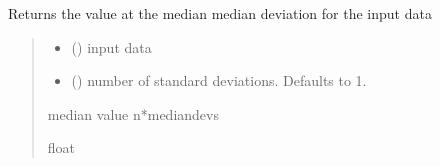 \documentclass[letterpaper,10pt,english]{sphinxmanual}
\begin{document}
\begin{fulllineitems}
\label{\detokenize{micropolarray:micropolarray.utils.median_minus_std}}
\pysigstartsignatures
{}
\pysigstopsignatures
\sphinxAtStartPar
Returns the value at the median \sphinxhyphen{} median deviation for the input data
\begin{quote}\begin{description}
\begin{itemize}
\item {} 
\sphinxAtStartPar
{} () \textendash{} input data

\item {} 
\sphinxAtStartPar
{} (\sphinxstyleliteralemphasis{\sphinxupquote{, }}) \textendash{} number of standard deviations. Defaults to 1.

\end{itemize}

\sphinxAtStartPar
median value \sphinxhyphen{} n*mediandevs

\sphinxAtStartPar
float

\end{description}\end{quote}

\end{fulllineitems}

\end{document}

